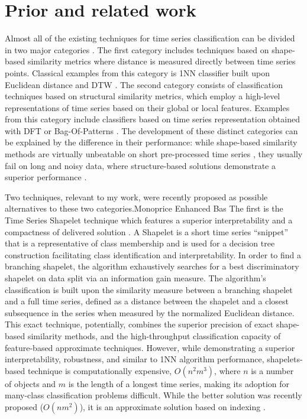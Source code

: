 \section{Prior and related work} \label{sax_vsm_prior}
Almost all of the existing techniques for time series classification can be divided in two major categories \cite{citeulike:11796594}. 
The first category includes techniques based on shape-based similarity metrics where distance is measured directly between time 
series points. Classical examples from this category is 1NN classifier built upon Euclidean distance \cite{citeulike:4214336} and 
DTW \cite{citeulike:3496861}. The second category consists of classification techniques based on structural similarity metrics, 
which employ a high-level representations of time series based on their global or local features. 
Examples from this category include classifiers based on time series representation obtained with DFT \cite{citeulike:5094223} or 
Bag-Of-Patterns \cite{citeulike:10525778}. 
The development of these distinct categories can be explained by the difference in their performance: 
while shape-based similarity methods are virtually unbeatable on short pre-processed time series \cite{citeulike:532340}, 
they usually fail on long and noisy data, where structure-based solutions demonstrate a superior performance \cite{citeulike:10525778}. 

Two techniques, relevant to my work, were recently proposed as possible alternatives to these two categories.Monoprice Enhanced Bas
The first is the Time Series Shapelet technique which features a superior interpretability and a compactness of delivered solution 
\cite{citeulike:7344347}. A Shapelet is a short time series ``snippet'' that is a representative of class
membership and is used for a decision tree construction facilitating class identification and interpretability.
In order to find a branching shapelet, the algorithm exhaustively searches for a best discriminatory shapelet on data split 
via an information gain measure. The algorithm's classification is built upon the similarity measure between a branching 
shapelet and a full time series, defined as a distance between the shapelet and a closest subsequence in the series 
when measured by the normalized Euclidean distance. This exact technique, potentially, combines the superior precision of 
exact shape-based similarity methods, and the high-throughput classification capacity of feature-based approximate techniques. 
However, while demonstrating a superior interpretability, robustness, and similar to 1NN algorithm performance, shapelets-based 
technique is computationally expensive, $O(n^{2}m^{3})$, where $n$ is a number of objects and $m$ is the length of a longest 
time series, making its adoption for many-class classification problems difficult\cite{citeulike:11345338}. 
While the better solution was recently proposed ($O(nm^{2})$), it is an approximate solution based on indexing \cite{citeulike:12563493}.

